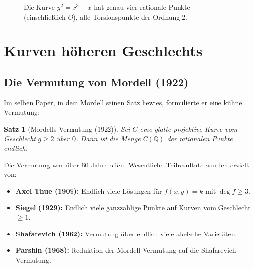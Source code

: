 ﻿\documentclass[12pt,a4paper]{article}
\theoremstyle{plain}
\newtheorem{theorem}{Satz}[section]
\theoremstyle{definition}
\theoremstyle{remark}
\newcommand{\Q}{\mathbb{Q}}
\newcommand{\Z}{\mathbb{Z}}
\begin{document}
\begin{figure}[H]
\centering
{}
\caption{Die Kurve $y^2 = x^3 - x$ hat genau vier rationale Punkte (einschließlich $O$),
  alle Torsionspunkte der Ordnung $2$.}
\label{fig:torsion}
\end{figure}

\section{Kurven höheren Geschlechts}

\subsection{Die Vermutung von Mordell (1922)}

Im selben Paper, in dem Mordell seinen Satz bewies, formulierte er eine kühne Vermutung:

\begin{theorem}[Mordells Vermutung (1922)]\label{thm:mordell_verm}
Sei $C$ eine glatte projektive Kurve vom Geschlecht $g \geq 2$ über $\Q$.
Dann ist die Menge $C(\Q)$ der rationalen Punkte \emph{endlich}.
\end{theorem}

Die Vermutung war über 60 Jahre offen. Wesentliche Teilresultate wurden erzielt von:
\begin{itemize}
  \item \textbf{Axel Thue (1909):} Endlich viele Lösungen für $f(x,y)=k$ mit $\deg f \geq 3$.
  \item \textbf{Siegel (1929):} Endlich viele ganzzahlige Punkte auf Kurven vom Geschlecht $\geq 1$.
  \item \textbf{Shafarevich (1962):} Vermutung über endlich viele abelsche Varietäten.
  \item \textbf{Parshin (1968):} Reduktion der Mordell-Vermutung auf die Shafarevich-Vermutung.
\end{itemize}
\end{document}
